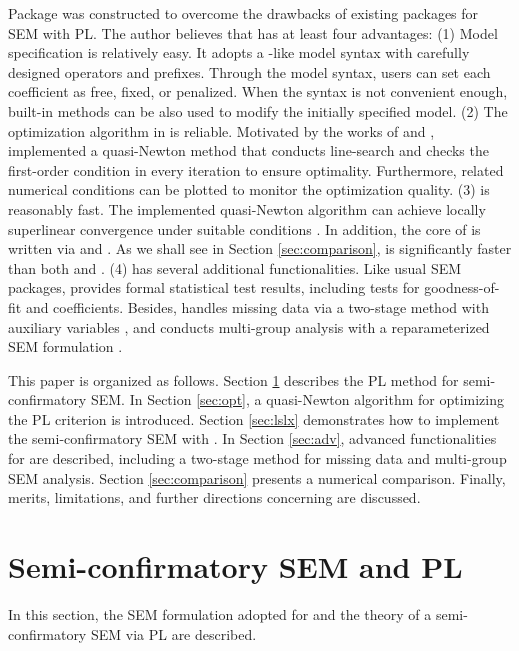 \documentclass[nojss]{jss}
\begin{document}
Package  was constructed to overcome the drawbacks of existing packages for SEM with PL. The author believes that  has at least four advantages: (1) Model specification is relatively easy. It adopts a -like model syntax with carefully designed operators and prefixes. Through the model syntax, users can set each coefficient as free, fixed, or penalized. When the syntax is not convenient enough, built-in methods can be also used to modify the initially specified model. (2) The optimization algorithm in  is reliable. Motivated by the works of \cite{Friedman2010} and \cite{Yuan:2012:IGL:2503308.2343708},  implemented a quasi-Newton method that conducts line-search and checks the first-order condition in every iteration to ensure optimality. Furthermore, related numerical conditions can be plotted to monitor the optimization quality. (3)  is reasonably fast. The implemented quasi-Newton algorithm can achieve locally superlinear convergence under suitable conditions \citep{Yuan:2012:IGL:2503308.2343708}. In addition, the core of  is written via  \citep{Rcpp1} and  \citep{RcppEigen}. As we shall see in Section \ref{sec:comparison},  is significantly faster than both  and . (4)  has several additional functionalities. Like usual SEM packages,  provides formal statistical test results, including tests for goodness-of-fit and coefficients. Besides,  handles missing data via a two-stage method with auxiliary variables \citep{Savalei2009}, and conducts multi-group analysis with a reparameterized SEM formulation \citep{Huang2018}.

This paper is organized as follows. Section \ref{sec:sem} describes the PL method for semi-confirmatory SEM. In Section \ref{sec:opt}, a quasi-Newton algorithm for optimizing the PL criterion is introduced. Section \ref{sec:lslx} demonstrates how to implement the semi-confirmatory SEM with . In Section \ref{sec:adv}, advanced functionalities for  are described, including a two-stage method for missing data and multi-group SEM analysis. Section \ref{sec:comparison} presents a numerical comparison. Finally, merits, limitations, and further directions concerning  are discussed.

\section{Semi-confirmatory SEM and PL} \label{sec:sem}
In this section, the SEM formulation adopted for  and the theory of a semi-confirmatory SEM via PL are described. 
\end{document}
